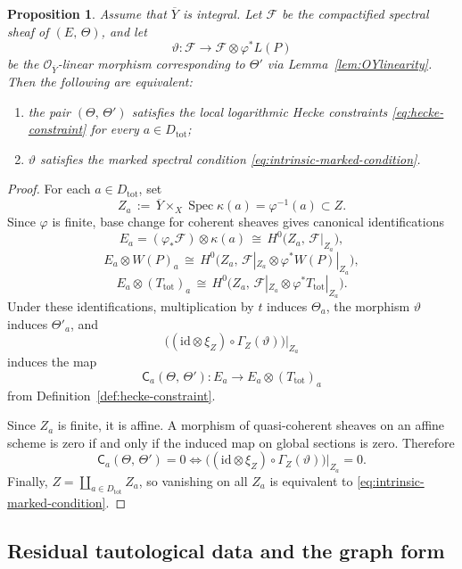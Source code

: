 \documentclass[a4paper,12pt]{amsart}
\numberwithin{equation}{section}
\newtheorem{proposition}[theorem]{Proposition}
\theoremstyle{definition}
\newcommand{\OO}{\mathcal{O}}
\newcommand{\cF}{\mathcal{F}}
\newcommand{\Spec}{\operatorname{Spec}}
\newcommand{\id}{\mathrm{id}}
\begin{document}
\begin{proposition}\label{prop:intrinsic-marked-condition}
Assume that \(\overline{Y}\) is integral.  Let \(\cF\) be the compactified spectral sheaf of \((E,\,\Theta)\), and let
\[
\vartheta:\cF\longrightarrow \cF\otimes \varphi^*L(P)
\]
be the \(\OO_{\overline{Y}}\)-linear morphism corresponding to \(\Theta'\) via Lemma~\ref{lem:OYlinearity}.  Then the following are equivalent:
\begin{enumerate}
\item[(i)] the pair \((\Theta,\,\Theta')\) satisfies the local logarithmic Hecke constraints \eqref{eq:hecke-constraint} for every \(a\in D_{\mathrm{tot}}\);
\item[(ii)] \(\vartheta\) satisfies the marked spectral condition \eqref{eq:intrinsic-marked-condition}.
\end{enumerate}
\end{proposition}
\begin{proof}
For each \(a\in D_{\mathrm{tot}}\), set
\[
Z_a\,:=\,\overline{Y}\times_X \Spec \kappa(a)=\varphi^{-1}(a)\subset Z.
\]
Since \(\varphi\) is finite, base change for coherent sheaves gives canonical identifications
\[
E_a=(\varphi_*\cF)\otimes \kappa(a)\,\cong\, H^0\bigl(Z_a,\,\cF|_{Z_a}\bigr),
\]
\[
E_a\otimes W(P)_a
\,\cong\,
H^0\bigl(Z_a,\,\cF|_{Z_a}\otimes \varphi^*W(P)|_{Z_a}\bigr),
\]
\[
E_a\otimes (T_{\mathrm{tot}})_a
\,\cong\,
H^0\bigl(Z_a,\,\cF|_{Z_a}\otimes \varphi^*T_{\mathrm{tot}}|_{Z_a}\bigr).
\]
Under these identifications, multiplication by \(t\) induces \(\Theta_a\), the morphism \(\vartheta\) induces \(\Theta'_a\), and
\[
\bigl((\id\otimes \xi_Z)\circ \Gamma_Z(\vartheta)\bigr)|_{Z_a}
\]
induces the map
\[
\mathsf{C}_a(\Theta,\,\Theta'):
E_a\longrightarrow E_a\otimes (T_{\mathrm{tot}})_a
\]
from Definition~\ref{def:hecke-constraint}.

Since \(Z_a\) is finite, it is affine.  A morphism of quasi-coherent sheaves on an affine scheme is zero if and only if the induced map on global sections is zero.  Therefore
\[
\mathsf{C}_a(\Theta,\,\Theta')=0
\iff
\bigl((\id\otimes \xi_Z)\circ \Gamma_Z(\vartheta)\bigr)|_{Z_a}=0.
\]
Finally, \(Z=\coprod_{a\in D_{\mathrm{tot}}} Z_a\), so vanishing on all \(Z_a\) is equivalent to \eqref{eq:intrinsic-marked-condition}.
\end{proof}

\subsection{Residual tautological data and the graph form}
\end{document}
